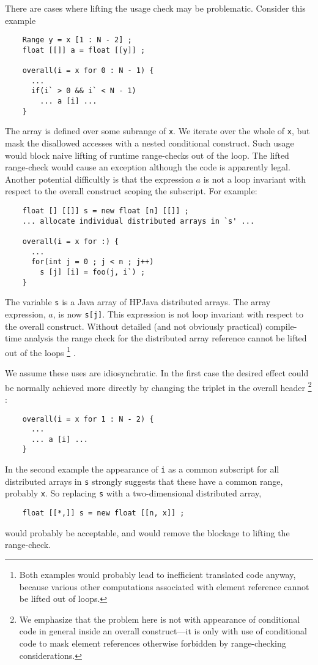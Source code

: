 \documentclass{article}
\begin{document}
There are cases where lifting the usage check may be problematic.
Consider this example
\small
\begin{verbatim}
    Range y = x [1 : N - 2] ;
    float [[]] a = float [[y]] ;

    overall(i = x for 0 : N - 1) {
      ...
      if(i` > 0 && i` < N - 1)
        ... a [i] ...
    }
\end{verbatim}
\normalsize
The array is defined over some subrange of {\tt x}.  We iterate
over the whole of {\tt x}, but mask the disallowed accesses with a
nested conditional construct.  Such usage would block naive lifting of
runtime range-checks out of the loop.  The lifted range-check would
cause an exception although the code is apparently legal.
Another potential difficultly is that the expression $a$ is not a loop
invariant with respect to the overall construct scoping the subscript.
For example:
\small
\begin{verbatim}
    float [] [[]] s = new float [n] [[]] ;
    ... allocate individual distributed arrays in `s' ...

    overall(i = x for :) {
      ...
      for(int j = 0 ; j < n ; j++)
        s [j] [i] = foo(j, i`) ;
    }
\end{verbatim}
\normalsize
The variable {\tt s} is a Java array of HPJava distributed arrays.
The array expression, $a$, is now {\tt s[j]}.  This expression is
not loop invariant with respect to the overall construct.
Without detailed (and not obviously practical) compile-time analysis
the range check for the distributed array reference cannot be
lifted out of the loops%
\footnote{Both examples would probably lead to inefficient translated
code anyway, because various other computations associated with element
reference cannot be lifted out of loops.}%
.

We assume these uses are idiosynchratic.  In the first case
the desired effect could be normally achieved more directly by
changing the triplet in the overall header%
\footnote{We emphasize that the problem here is not with appearance of
conditional code in general inside an overall construct---it is only
with use of conditional code to mask element references otherwise
forbidden by range-checking considerations.}%
:
\small
\begin{verbatim}
    overall(i = x for 1 : N - 2) {
      ...
      ... a [i] ...
    }
\end{verbatim}
\normalsize
In the second example the appearance of {\tt i} as a common subscript for all
distributed arrays in {\tt s} strongly suggests that these have a
common range, probably {\tt x}.  So replacing {\tt s} with a two-dimensional
distributed array,
\small
\begin{verbatim}
    float [[*,]] s = new float [[n, x]] ;
\end{verbatim}
\normalsize
would probably be acceptable, and would remove the blockage to lifting
the range-check.
\end{document}
